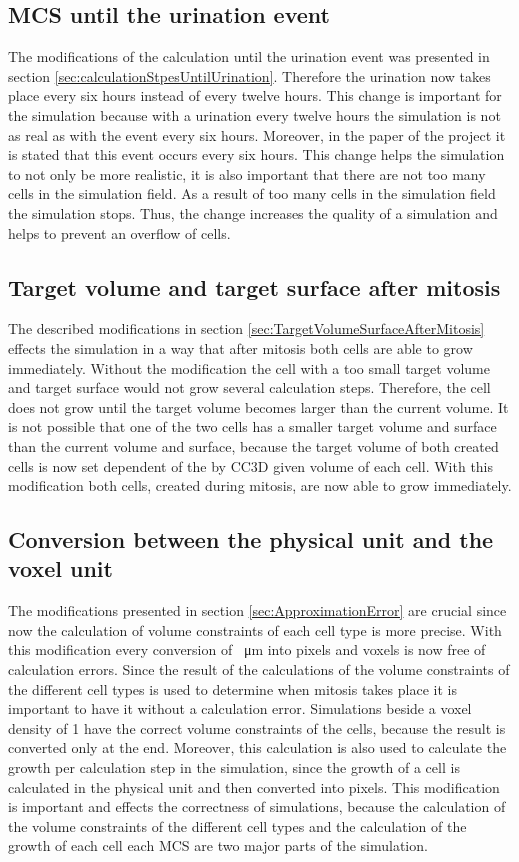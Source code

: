 \subsection{\ac{MCS} until the urination event}
The modifications of the calculation until the urination event was presented in section \ref{sec:calculationStpesUntilUrination}. Therefore the urination now takes place every six hours instead of every twelve hours. This change is important for the simulation because with a urination every twelve hours the simulation is not as real as with the event every six hours. Moreover, in the paper \cite{Torelli2017} of the project it is stated that this event occurs every six hours. This change helps the simulation to not only be more realistic, it is also important that there are not too many cells in the simulation field. As a result of too many cells in the simulation field the simulation stops. Thus, the change increases the quality of a simulation and helps to prevent an overflow of cells.
\subsection{Target volume and target surface after mitosis}
The described modifications in section \ref{sec:TargetVolumeSurfaceAfterMitosis} effects the simulation in a way that after mitosis both cells are able to grow immediately. Without the modification the cell with a too small target volume and target surface would not grow several calculation steps. Therefore, the cell does not grow until the target volume becomes larger than the current volume. It is not possible that one of the two cells has a smaller target volume and surface than the current volume and surface, because the target volume of both created cells is now set dependent of the by \ac{CC3D} given volume of each cell. With this modification both cells, created during mitosis, are now able to grow immediately.
\subsection{Conversion between the physical unit and the voxel unit}
The modifications presented in section \ref{sec:ApproximationError} are crucial since now the calculation of volume constraints of each cell type is more precise. With this modification every conversion of \SI{}{\micro\metre} into pixels and voxels is now free of calculation errors. Since the result of the calculations of the volume constraints of the different cell types is used to determine when mitosis takes place it is important to have it without a calculation error. Simulations beside a voxel density of 1 have the correct volume constraints of the cells, because the result is converted only at the end. Moreover, this calculation is also used to calculate the growth per calculation step in the simulation, since the growth of a cell is calculated in the physical unit and then converted into pixels. This modification is important and effects the correctness of simulations, because the calculation of the volume constraints of the different cell types and the calculation of the growth of each cell each \ac{MCS} are two major parts of the simulation.\newline
\newline

